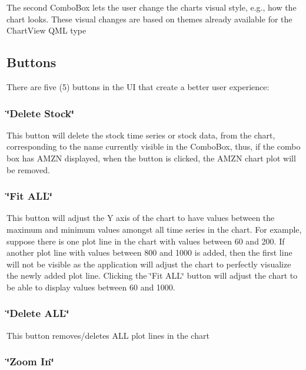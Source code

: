 The second Combo\+Box lets the user change the chart\textquotesingle{}s visual style, e.\+g., how the chart looks. These visual changes are based on themes already available for the Chart\+View Q\+ML type ~\newline
 ~\newline
\hypertarget{index_buttons}{}\subsection{Buttons}\label{index_buttons}
There are five (5) buttons in the UI that create a better user experience\+: ~\newline
\hypertarget{index_button1}{}\subsubsection{\char`\"{}\+Delete Stock\char`\"{}}\label{index_button1}
This button will delete the stock time series or stock data, from the chart, corresponding to the name currently visible in the Combo\+Box, thus, if the combo box has A\+M\+ZN displayed, when the button is clicked, the A\+M\+ZN chart plot will be removed. ~\newline
\hypertarget{index_button2}{}\subsubsection{\char`\"{}\+Fit A\+L\+L\char`\"{}}\label{index_button2}
This button will adjust the Y axis of the chart to have values between the maximum and minimum values amongst all time series in the chart. For example, suppose there is one plot line in the chart with values between 60 and 200. If another plot line with values between 800 and 1000 is added, then the first line will not be visible as the application will adjust the chart to perfectly visualize the newly added plot line. Clicking the \char`\"{}\+Fit A\+L\+L\char`\"{} button will adjust the chart to be able to display values between 60 and 1000. ~\newline
\hypertarget{index_button3}{}\subsubsection{\char`\"{}\+Delete A\+L\+L\char`\"{}}\label{index_button3}
This button removes/deletes A\+LL plot lines in the chart ~\newline
\hypertarget{index_button4}{}\subsubsection{\char`\"{}\+Zoom In\char`\"{}}\label{index_button4}
